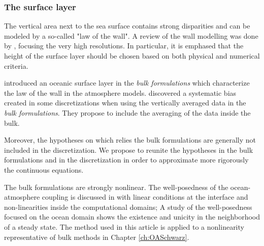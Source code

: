 \subsubsection*{The surface layer}
The vertical area next to the sea surface contains
strong disparities and can be modeled by a so-called
"law of the wall". A review of the wall modelling was done by
\citep{larsson_large_2016}, focusing the very high resolutions.
In particular, it is emphased that the height of the surface layer
should be chosen based on both physical and numerical criteria.
\par
\citep{pelletier_two-sided_2021} introduced an oceanic surface layer
in the \textit{bulk formulations} which characterize the law of
the wall in the atmosphere models.
\citep{nishizawa_surface_2018} discovered a systematic bias
created in some discretizations when using the vertically
averaged data in the \textit{bulk formulations}. They propose to
include the averaging of the data inside the bulk.
\par
Moreover, the hypotheses on which relies the bulk formulations
are generally not included in the discretization.
We propose to reunite the hypotheses in the bulk formulations
and in the discretization in order to
approximate more rigorously the continuous equations.
\par
The bulk formulations are strongly nonlinear.
The well-posedness of the ocean-atmosphere coupling is discussed
in \citep{lions_mathematical_1995} with linear conditions at
the interface and non-linearities inside the computational domains;
A study of the well-posedness focused on the ocean domain
\citep{chacon-rebollo_existence_2014} shows the existence and
unicity in the neighborhood of a steady state. The method
used in this article is applied to a nonlinearity
representative of bulk methods in Chapter
\ref{ch:OASchwarz}.
%
